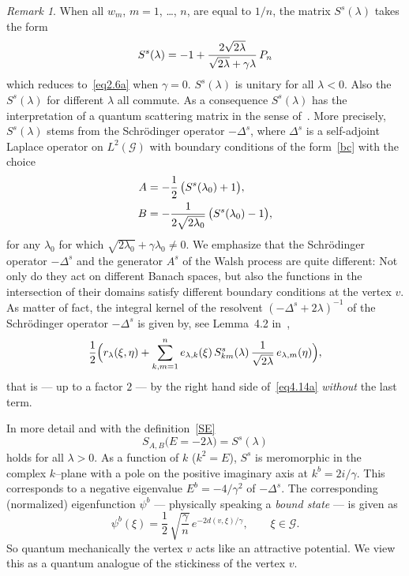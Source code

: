 \documentclass[11pt,a4paper]{amsart}
\renewcommand{\gg}{\gamma}
\newcommand{\gl}{\lambda}
\newcommand{\gD}{\Delta}
\newcommand{\cG}{\mathcal{G}}
\newcommand{\1}{1}
\theoremstyle{remark}
\newtheorem{remark}[theorem]{Remark}
\newcommand{\sgl}{\ensuremath\sqrt{2\gl}}
\newcommand{\SsW}{\ensuremath S^s}
\numberwithin{equation}{section}
\begin{document}
\begin{remark}
When all $w_m$, $m=1$, \dots, $n$, are equal to $1/n$, the matrix $S^s(\gl)$ takes the
form
\begin{equation*}
	S^s(\gl) = -\1 + \frac{2\sgl}{\sgl + \gg \gl}\,P_n
\end{equation*}
which reduces to~\eqref{eq2.6a} when $\gg=0$. $S^s(\gl)$ is unitary for all $\gl<0$.
Also the $S^s(\gl)$ for different $\gl$ all commute. As a consequence $S^s(\gl)$
has the interpretation of a quantum scattering matrix in the sense of~\cite{KoSc99}.
More precisely, $S^s(\gl)$ stems from the Schr\"odinger operator $-\gD^s$, where
$\gD^s$ is a self-adjoint Laplace operator on $L^2(\cG)$ with boundary conditions
of the form~\eqref{bc} with the choice
\begin{equation}		\label{AB}
\begin{split}
	A &= - \frac{1}{2}\,\bigl(S^s(\gl_0)+\1\bigr),\\
	B &= - \frac{1}{2\sqrt{\mathstrut2\gl_0}}\,\bigl(S^s(\gl_0)-\1\bigr),
\end{split}
\end{equation}
for any $\gl_0$ for which $\sqrt{2\gl_0}+\gg\gl_0\ne 0$. We emphasize that
the Schr\"odinger operator $-\gD^s$ and the generator $A^s$ of the Walsh process
are quite different: Not only do they act on different Banach spaces,
but also the functions in the intersection of their domains satisfy different
boundary conditions at the vertex $v$. As matter of fact, the integral kernel
of the resolvent  $(-\gD^s+2\gl)^{-1}$ of the Schr\"odinger operator $-\gD^s$ is
given by, see Lemma~4.2 in~\cite{KoSc06},
\begin{equation*}
 \frac{1}{2}\Bigl(r_\gl(\xi,\eta)
            +\sum_{k,m=1}^n e_{\gl,k}(\xi)\,
				\SsW_{km}(\gl)\,\frac{1}{\sgl}\,e_{\gl,m}(\eta)\Bigl),
\end{equation*}
that is --- up to a factor $2$ --- by the right hand side of~\eqref{eq4.14a}
\emph{without} the last term.

In more detail and with the definition~\eqref{SE}
\begin{equation*}
	S_{A,B}\bigl(E=-2\gl\bigr) = S^s(\gl)
\end{equation*}
holds for all $\gl>0$. As a function of $k$ ($k^2=E$), $S^s$ is meromorphic in the complex $k$--plane with
a pole on the positive imaginary axis at $k^b=2i/\gg$. This corresponds to a negative
eigenvalue $E^b=-4/\gg^2$ of $-\gD^s$. The corresponding (normalized) eigenfunction
$\psi^b$ --- physically speaking a \emph{bound state} --- is given as
\begin{equation*}
	\psi^b(\xi) = \frac{1}{2}\,\sqrt{\frac{\gg}{n}}\,e^{-2 d(v,\xi)/\gg},\qquad \xi\in\cG.
\end{equation*}
So quantum mechanically the vertex $v$ acts like an attractive potential. We view this
as a quantum analogue of the stickiness of the vertex $v$.


\end{remark}
\end{document}
